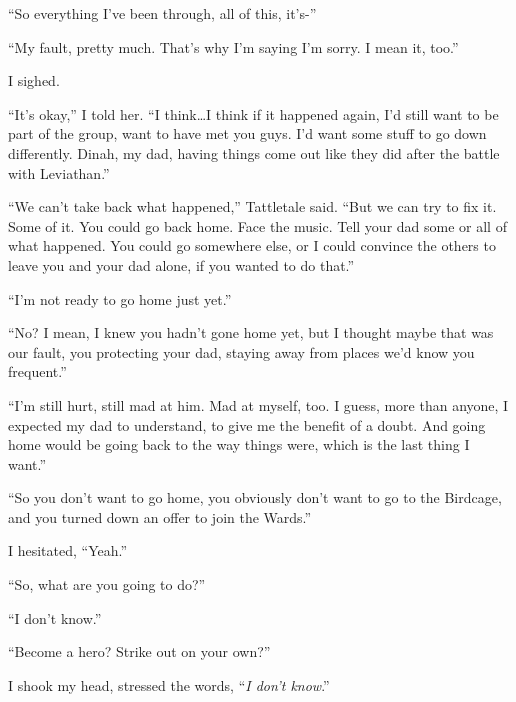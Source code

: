 ``So everything I've been through, all of this, it's-''



``My fault, pretty much.  That's why I'm saying I'm sorry.  I mean it, too.''



I sighed.



``It's okay,'' I told her.  ``I think\ldots I think if it happened again, I'd still want to be part of the group, want to have met you guys.  I'd want some stuff to go down differently.  Dinah, my dad, having things come out like they did after the battle with Leviathan.''



``We can't take back what happened,'' Tattletale said.  ``But we can try to fix it.  Some of it.  You could go back home.  Face the music.  Tell your dad some or all of what happened.  You could go somewhere else, or I could convince the others to leave you and your dad alone, if you wanted to do that.''



``I'm not ready to go home just yet.''



``No?  I mean, I knew you hadn't gone home yet, but I thought maybe that was our fault, you protecting your dad, staying away from places we'd know you frequent.''



``I'm still hurt, still mad at him.  Mad at myself, too.  I guess, more than anyone, I expected my dad to understand, to give me the benefit of a doubt.  And going home would be going back to the way things were, which is the last thing I want.''



``So you don't want to go home, you obviously don't want to go to the Birdcage, and you turned down an offer to join the Wards.''



I hesitated, ``Yeah.''



``So, what are you going to do?''



``I don't know.''



``Become a hero?  Strike out on your own?''



I shook my head, stressed the words, ``\emph{I don't know}.''



